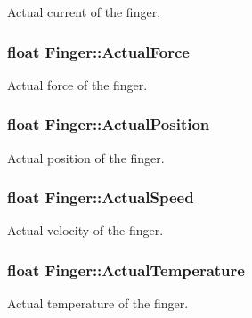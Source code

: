Actual current of the finger. 

\subsubsection[{\texorpdfstring{Actual\+Force}{ActualForce}}]{\setlength{\rightskip}{0pt plus 5cm}float Finger\+::\+Actual\+Force}\hypertarget{struct_finger_aeedf954fed8b85b6cfc6804c6533a428}{}\label{struct_finger_aeedf954fed8b85b6cfc6804c6533a428}


Actual force of the finger. 

\subsubsection[{\texorpdfstring{Actual\+Position}{ActualPosition}}]{\setlength{\rightskip}{0pt plus 5cm}float Finger\+::\+Actual\+Position}\hypertarget{struct_finger_a6a8082bb2dc6e4b1a809c351c2002a9d}{}\label{struct_finger_a6a8082bb2dc6e4b1a809c351c2002a9d}


Actual position of the finger. 

\subsubsection[{\texorpdfstring{Actual\+Speed}{ActualSpeed}}]{\setlength{\rightskip}{0pt plus 5cm}float Finger\+::\+Actual\+Speed}\hypertarget{struct_finger_aa934199555a980635f9ddc574cc6dd84}{}\label{struct_finger_aa934199555a980635f9ddc574cc6dd84}


Actual velocity of the finger. 

\subsubsection[{\texorpdfstring{Actual\+Temperature}{ActualTemperature}}]{\setlength{\rightskip}{0pt plus 5cm}float Finger\+::\+Actual\+Temperature}\hypertarget{struct_finger_a7e85083e7ee6aaf7f8ac0fcbf0b4ced8}{}\label{struct_finger_a7e85083e7ee6aaf7f8ac0fcbf0b4ced8}


Actual temperature of the finger. 


